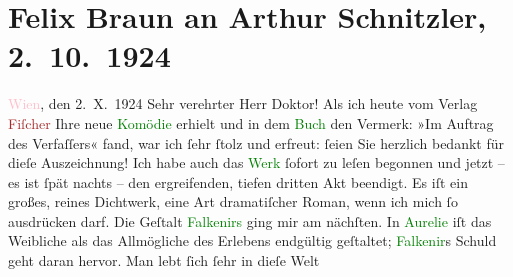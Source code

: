 

               \section[Felix Braun an Arthur Schnitzler, 2. 10. 1924]{ Felix Braun an Arthur Schnitzler, 2. 10. 1924}\nopagebreak{}\rehead{ }\normalsize\beginnumbering{} \toendnotes[C]{\smallbreak\pagebreak[2]} 
\toendnotes[C]{\smallbreak}\pstart
           \centering{}{\pb}\textcolor{pink}{Wien}{}\ledrightnote{\textcolor{pink}{Wien}}, den 2. X. 1924\pend
           \pstart{}Sehr verehrter Herr Doktor!\pend\pstart
           Als ich heute vom Verlag \textcolor{brown}{Fiſcher}{}\ledrightnote{\textcolor{brown}{S. Fischer Verlag}} Ihre neue \textcolor{green}{Komödie}{} erhielt und in dem
                        \textcolor{green}{Buch}{} den Vermerk: »Im
                    Auftrag des Verfaſſers« fand, war ich ſehr ſtolz und erfreut: ſeien Sie herzlich
                    bedankt für dieſe Auszeichnung!\pend
           \pstart
           Ich habe auch das \textcolor{green}{Werk}{} ſofort
                    zu leſen begonnen und jetzt – es ist ſpät nachts – den ergreifenden, tiefen
                    dritten Akt beendigt.\pend
           \pstart
           Es iſt ein großes, reines Dichtwerk, eine Art dramatiſcher Roman, wenn ich mich
                    ſo ausdrücken darf. Die Geſtalt \textcolor{green}{Falkenirs}{} ging mir am nächſten. In \textcolor{green}{Aurelie}{} iſt das Weibliche als das Allmögliche des
                    Erlebens endgültig geſtaltet; \textcolor{green}{Falkenir}{}s Schuld geht daran hervor. Man lebt ſich ſehr in dieſe Welt
